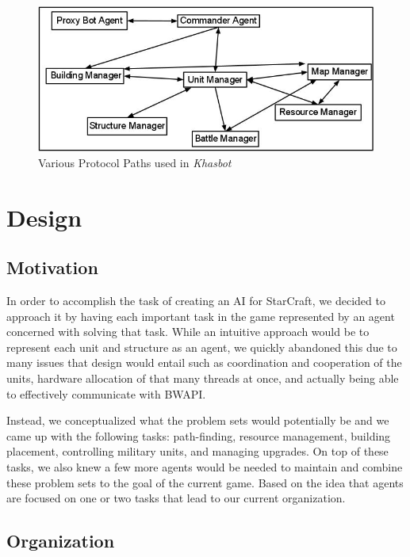 \documentclass[letterpaper]{article}
\begin{document}
\begin{figure}[htp]
\begin{center}
\includegraphics[scale=0.4]{ProtocolDiagramBWMAS.jpg}
\caption{Various Protocol Paths used in \emph{Khasbot}}
\label{fig:Protocol-diagram}
\end{center}
\end{figure}

\section{Design}
\subsection{Motivation}
In order to accomplish the task of creating an AI for StarCraft, we decided to approach it by having each important task in the game represented by an agent concerned with solving that task.  While an intuitive approach would be to represent each unit and structure as an agent, we quickly abandoned this due to many issues that design would entail such as coordination and cooperation of the units,  hardware allocation of that many threads at once, and actually being able to effectively communicate with BWAPI.

Instead, we conceptualized what the problem sets would potentially be and we came up with the following tasks: path-finding, resource management, building placement, controlling military units, and managing upgrades.  On top of these tasks, we also knew a few more agents would be needed to maintain and combine these problem sets to the goal of the current game.  Based on the idea that agents are focused on one or two tasks that lead to our current organization.   

\subsection{Organization}
\end{document}
